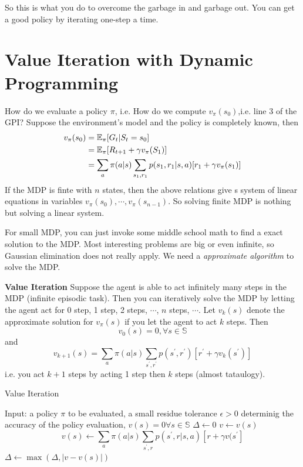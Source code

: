 \documentclass{article}
\begin{document}
So this is what you do to overcome the garbage in and garbage out. 
You can get a good policy by iterating one-step a time.

\section{Value Iteration with Dynamic Programming}
How do we evaluate a policy $\pi$, i.e. 
How do we compute $v_{\pi}(s_0)$,i.e. line 3 of the GPI? 
Suppose the environment's model and the policy is completely known,
then
\begin{align}
    v_{\pi}(s_0) & = \mathbb{E}_{\pi}[G_t | S_t=s_0] \\
                 & = \mathbb{E}_{\pi}[R_{t+1} + \gamma v_{\pi}(S_1)] \\
        & = \sum_a\pi(a|s)\sum_{s_1, r_1}p(s_1, r_1|s,a)[r_1 + \gamma 
        v_{\pi}(s_1)]
\end{align}
If the MDP is finte with $n$ states, then the above relations give s 
system of linear equations in variables $v_{\pi}(s_0),\cdots,v_{\pi}(s_{n-1})$. 
So solving finite MDP is nothing but solving a linear system. 

For small MDP, you can just invoke some middle school math to find a exact solution 
to the MDP. Most interesting problems are big or even infinite, so Gaussian 
elimination does not really apply. We need a \emph{approximate algorithm} to solve
the MDP. 

\textbf{Value Iteration} Suppose the agent is able to act infinitely many 
steps in the MDP (infinite episodic task). Then you can iteratively solve
the MDP by letting the agent act for 0 step, 1 step, 2 steps, $\cdots$, $n$ steps, 
$\cdots$. 
Let $v_k(s)$ denote the approximate solution for $v_{\pi}(s)$ if you let the agent
to act $k$ steps. Then 
\[
    v_0(s) = 0, \forall s \in \mathbb{S}
\]
and 
\[
    v_{k+1}(s) = \sum_{a}\pi(a|s)\sum_{s^{\prime},r^{\prime}}
        p(s^{\prime},r^{\prime})[r^{\prime} + \gamma v_k(s^{\prime})]
\]
i.e. you act $k+1$ steps by acting 1 step then $k$ steps (almost tataulogy).

\begin{algorithm}[H]
    \caption{Value Iteration}
\end{algorithm}

\begin{algorithmic}[1]
    \STATE Input: a policy $\pi$ to be evaluated, a small residue tolerance
    $\epsilon > 0$ determinig the accuracy of the policy evaluation, 
    $v(s) = 0 \forall s \in \mathbb{S}$
    \REPEAT 
    \STATE $\Delta \leftarrow 0$
    \STATE $v \leftarrow v(s)$
    \STATE 
    \[ 
        v(s) \leftarrow \sum_a\pi(a|s)\sum_{s^{\prime},r}
        p(s^{\prime},r |s,a) [r + \gamma v(s^{\prime}]
    \]
    \STATE $\Delta \leftarrow \max(\Delta , |v - v(s)|)$
    \ENDFOR
    \UNTIL {$\Delta \le \epsilon$}
\end{algorithmic}
\end{document}
